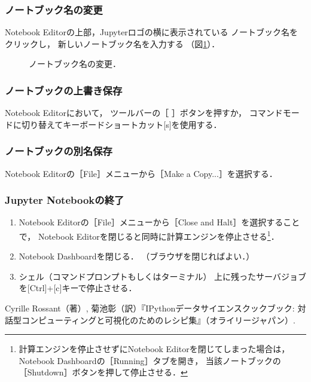 \subsubsection{ノートブック名の変更}
Notebook Editorの上部，Jupyterロゴの横に表示されている
ノートブック名をクリックし，
新しいノートブック名を入力する
（図\ref{fig: ノートブック名の変更}）．

\begin{figure}[htbp]
\centering
\setlength{\fboxsep}{0pt}
\caption{\label{fig: ノートブック名の変更}%
ノートブック名の変更．
}
\end{figure}


\subsubsection{ノートブックの上書き保存}
Notebook Editorにおいて，
ツールバーの［\,\faFloppyO\,］ボタンを押すか，
コマンドモードに切り替えてキーボードショートカット[s]を使用する．


\subsubsection{ノートブックの別名保存}
Notebook Editorの［File］メニューから［Make a Copy...］を選択する．


\subsubsection{Jupyter Notebookの終了}
\begin{enumerate}
\item
Notebook Editorの［File］メニューから［Close and Halt］を選択することで，
Notebook Editorを閉じると同時に計算エンジンを停止させる\footnote{%
計算エンジンを停止させずにNotebook Editorを閉じてしまった場合は，
Notebook Dashboardの［Running］タブを開き，
当該ノートブックの［Shutdown］ボタンを押して停止させる．
}．
\item
Notebook Dashboardを閉じる．
（ブラウザを閉じればよい．）
\item
シェル（コマンドプロンプトもしくはターミナル）
上に残ったサーバジョブを[Ctrl]+[c]キーで停止させる．
\end{enumerate}


\begin{thebibliography}{9}
Cyrille Rossant（著）, 菊池彰（訳）『IPythonデータサイエンスクックブック: 対話型コンピューティングと可視化のためのレシピ集』（オライリージャパン）.
\end{thebibliography}

